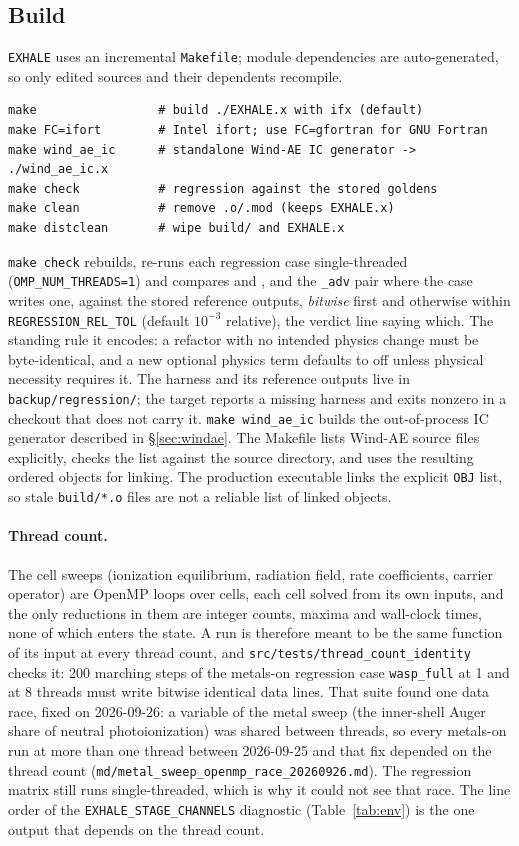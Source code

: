 \documentclass[english,a4paper]{my_memo}
\begin{document}
\subsection{Build}
\texttt{EXHALE} uses an incremental \texttt{Makefile}; module dependencies
are auto-generated, so only edited sources and their dependents recompile.
\begin{lstlisting}[style=sh]
make                 # build ./EXHALE.x with ifx (default)
make FC=ifort        # Intel ifort; use FC=gfortran for GNU Fortran
make wind_ae_ic      # standalone Wind-AE IC generator -> ./wind_ae_ic.x
make check           # regression against the stored goldens
make clean           # remove .o/.mod (keeps EXHALE.x)
make distclean       # wipe build/ and EXHALE.x
\end{lstlisting}
\texttt{make check} rebuilds, re-runs each regression case single-threaded
(\texttt{OMP\_NUM\_THREADS=1}) and
compares  and
, and the \texttt{\_adv} pair where the case
writes one, against the stored reference outputs,
\emph{bitwise} first and otherwise within \texttt{REGRESSION\_REL\_TOL}
(default $10^{-3}$ relative), the verdict line saying which. The
standing rule it encodes: a refactor with no intended physics change must be
byte-identical, and a new optional physics term defaults to off unless physical
necessity requires it. The harness and
its reference outputs live in \texttt{backup/regression/}; the target reports
a missing harness and exits nonzero in a checkout that does not carry
it. \texttt{make wind\_ae\_ic} builds the out-of-process IC generator described
in \S\ref{sec:windae}.
The Makefile lists Wind-AE source files explicitly, checks the list against
the source directory, and uses the resulting ordered objects for linking.
The production executable links the explicit \texttt{OBJ} list, so stale
\texttt{build/*.o} files are not a reliable list of linked objects.

\paragraph{Thread count.} The cell sweeps (ionization equilibrium, radiation
field, rate coefficients, carrier operator) are OpenMP loops over cells, each
cell solved from its own inputs, and the only reductions in them are integer
counts, maxima and wall-clock times, none of which enters the state. A run is
therefore meant to be the same function of its input at every thread count,
and \texttt{src/tests/thread\_count\_identity} checks it: 200 marching steps of
the metals-on regression case \texttt{wasp\_full} at 1 and at 8 threads must
write bitwise identical data lines. That suite found one data race, fixed on
2026-09-26: a variable of the metal sweep (the inner-shell Auger share of
neutral photoionization) was shared between threads, so every metals-on run at
more than one thread between 2026-09-25 and that fix depended on the thread
count (\texttt{md/metal\_sweep\_openmp\_race\_20260926.md}). The regression
matrix still runs single-threaded, which is why it could not see that race.
The line order of the \texttt{EXHALE\_STAGE\_CHANNELS} diagnostic
(Table~\ref{tab:env}) is the one output that depends on the thread count.
\end{document}
